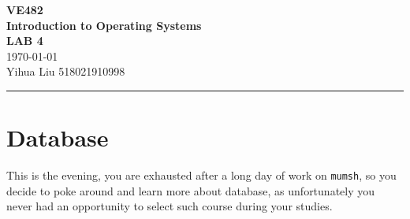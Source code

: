 \documentclass[a4paper]{article}
\begin{document}
\begin{center}
    \huge
    \textbf{VE482\\Introduction to Operating Systems\\}
    \Large
    \vspace{15pt}
    \uppercase{\textbf{Lab 4}}\\
    \large
    \vspace{5pt}\today\\
    \vspace{5pt}
    Yihua Liu 518021910998
    \vspace{5pt}
    \rule[-5pt]{.97\linewidth}{0.05em}
\end{center}
\section{Database}
This is the evening, you are exhausted after a long day of work on \texttt{mumsh}, so you decide to poke around and learn more about database, as unfortunately you never had an opportunity to select such course during your studies.
\end{document}
